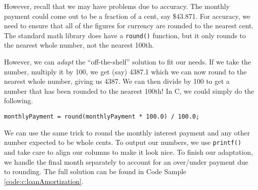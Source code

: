 However, recall that we may have problems due to accuracy.  The monthly
payment could come out to be a fraction of a cent, say \$43.871.  For 
accuracy, we need to ensure that all of the figures for currency are rounded
to the nearest cent.  The standard math library does have a \texttt{round()}
function, but it only rounds to the nearest whole number, not the nearest
100th.

However, we can \emph{adapt} the ``off-the-shelf'' solution to fit our needs.  
If we take the number, multiply it by 100, we get (say) 4387.1 which we can
now round to the nearest whole number, giving us 4387.  We can then 
divide by 100 to get a number that has been rounded to the nearest 100th!
In C, we could simply do the following.

\texttt{monthlyPayment = round(monthlyPayment * 100.0) / 100.0;}

We can use the same trick to round the monthly interest payment and any
other number expected to be whole cents.  To output our numbers, we use
\texttt{printf()} and take care to align our columns to make it look 
nice.  To finish our adaptation, we handle the final month separately to account
for an over/under payment due to rounding.  The full solution can be found
in Code Sample \ref{code:c:loanAmortization}.

